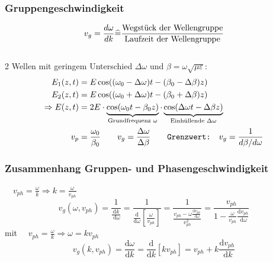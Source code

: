 \subsubsection{Gruppengeschwindigkeit}
\[
	v_g = \dfrac{d \omega}{d k} \widehat{=} \dfrac{\textnormal{Wegstück der Wellengruppe}}{\textnormal{Laufzeit der Wellengruppe}}
\]
\\
2 Wellen mit geringem Unterschied $ \Delta \omega $ und $ \beta =\omega \sqrt{\mu \varepsilon} $:
\begin{align*}
	E_1(z,t)           & = E\cos((\omega_0-\Delta\omega)t-(\beta_0-\Delta\beta)z)                                                                                                                                     \\
	E_2(z,t)           & = E\cos((\omega_0+\Delta\omega)t-(\beta_0+\Delta\beta)z)                                                                                                                                     \\
	\Rightarrow E(z,t) & = 2E\cdot\underbrace{\cos(\omega_0t-\beta_0z)}_{\mathclap{\text{Grundfrequenz $\omega$}}}\cdot\underbrace{\cos(\Delta\omega t-\Delta\beta z)}_{\mathclap{\text{Einhüllende $\Delta\omega$}}} \\
	v_p                & = \frac{\omega_0}{\beta_0}          \qquad
	v_g        = \frac{\Delta\omega}{\Delta\beta} \qquad \texttt{Grenzwert:} \quad v_g =  \frac{1}{d\beta/d\omega}
\end{align*}

\subsubsection{Zusammenhang Gruppen- und Phasengeschwindigkeit}
$\quad v_{p h}=\frac{\omega}{k} \Rightarrow k=\frac{\omega}{v_{p h}}$
$$
	v_g\left(\omega, v_{p h}\right)=\frac{1}{\frac{\mathrm{d} k}{\mathrm{~d} \omega}}=\frac{1}{\frac{\mathrm{d}}{\mathrm{d} \omega}\left[\frac{\omega}{v_{p h}}\right]}=\frac{1}{\frac{v_{p h}-\omega \frac{\mathrm{d} v_{p h}}{\mathrm{~d} \omega}}{v_{p h}^2}}=\frac{v_{p h}}{1-\frac{\omega}{v_{p h}} \frac{\mathrm{d} v_{p h}}{\mathrm{~d} \omega}}
$$
mit $\quad v_{p h}=\frac{\omega}{k} \Rightarrow \omega=k v_{p h}$
$$
	v_g\left(k, v_{p h}\right)=\frac{\mathrm{d} \omega}{\mathrm{d} k}=\frac{\mathrm{d}}{\mathrm{d} k}\left[k v_{p h}\right]=v_{p h}+k \frac{\mathrm{d} v_{p h}}{\mathrm{~d} k}
$$

